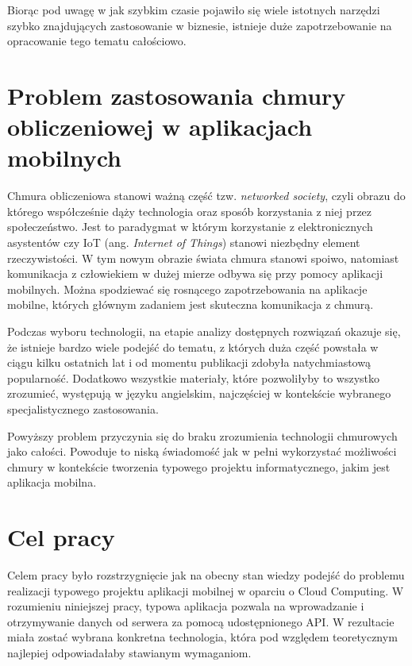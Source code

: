 \documentclass[12pt,a4paper,twoside,titlepage,openright]{book}
\begin{document}
Biorąc pod uwagę w jak szybkim czasie pojawiło się wiele istotnych narzędzi szybko znajdujących zastosowanie w biznesie, istnieje duże zapotrzebowanie na opracowanie tego tematu całościowo. 

\section*{Problem zastosowania chmury obliczeniowej w aplikacjach mobilnych}

Chmura obliczeniowa stanowi ważną część tzw. \textit{networked society}, czyli obrazu do którego współcześnie dąży technologia oraz sposób korzystania z niej przez społeczeństwo. Jest to paradygmat w którym korzystanie z elektronicznych asystentów czy IoT (ang. \textit{Internet of Things}) stanowi niezbędny element rzeczywistości.\cite{ccSpringer} W tym nowym obrazie świata chmura stanowi spoiwo, natomiast komunikacja z człowiekiem w dużej mierze odbywa się przy pomocy aplikacji mobilnych. Można spodziewać się rosnącego zapotrzebowania na aplikacje mobilne, których głównym zadaniem jest skuteczna komunikacja z chmurą. 

Podczas wyboru technologii, na etapie analizy dostępnych rozwiązań okazuje się, że istnieje bardzo wiele podejść do tematu, z których duża część powstała w ciągu kilku ostatnich lat i od momentu publikacji zdobyła natychmiastową popularność. Dodatkowo wszystkie materiały, które pozwoliłyby to wszystko zrozumieć, występują w języku angielskim, najczęściej w kontekście wybranego specjalistycznego zastosowania. 

Powyższy problem przyczynia się do braku zrozumienia technologii chmurowych jako całości. Powoduje to niską świadomość jak w pełni wykorzystać możliwości chmury w kontekście tworzenia typowego projektu informatycznego, jakim jest aplikacja mobilna.





\section*{Cel pracy}


Celem pracy było rozstrzygnięcie jak na obecny stan wiedzy podejść do problemu realizacji typowego projektu aplikacji mobilnej w oparciu o Cloud Computing. W rozumieniu niniejszej pracy, typowa aplikacja pozwala na wprowadzanie i otrzymywanie danych od serwera za pomocą udostępnionego API. W rezultacie miała zostać wybrana konkretna technologia, która pod względem teoretycznym najlepiej odpowiadałaby stawianym wymaganiom.
\end{document}

